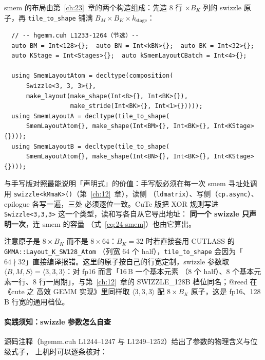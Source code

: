 smem 的布局由第~\ref{ch:23}~章的两个构造组成：先造 8 行 $\times B_K$ 列的
swizzle 原子，再 \texttt{tile\_\allowbreak{}to\_\allowbreak{}shape} 铺满
$B_M\times B_K\times k_{\mathrm{stage}}$：

\begin{lstlisting}
  // -- hgemm.cuh L1233-1264（节选）--
  auto BM = Int<128>{};  auto BN = Int<kBN>{};  auto BK = Int<32>{};
  auto KStage = Int<Stages>{};  auto kSmemLayoutCBatch = Int<4>{};

  using SmemLayoutAtom = decltype(composition(
      Swizzle<3, 3, 3>{},
      make_layout(make_shape(Int<8>{}, Int<BK>{}),
                  make_stride(Int<BK>{}, Int<1>{}))));
  using SmemLayoutA = decltype(tile_to_shape(
      SmemLayoutAtom{}, make_shape(Int<BM>{}, Int<BK>{}, Int<KStage>{})));
  using SmemLayoutB = decltype(tile_to_shape(
      SmemLayoutAtom{}, make_shape(Int<BN>{}, Int<BK>{}, Int<KStage>{})));
\end{lstlisting}

与手写版对照最能说明「声明式」的价值：手写版必须在每一次 smem 寻址处调用
\texttt{swizzle}\allowbreak\texttt{<kMmaK>()}（第~\ref{ch:12}~章），读侧
（\texttt{ldmatrix}）、写侧（\texttt{cp.async}）、epilogue 各写一遍，三处
必须逐位一致。CuTe 版把 XOR
规则写进 \texttt{Swizzle\allowbreak{}<3,\allowbreak{}3,\allowbreak{}3>} 这一个类型，读和写各自从它导出地址：
\textbf{同一个 swizzle 只声明一次}，连 smem 的容量
（式~\eqref{eq:24-smem}）也由它算出。

注意原子是 $8\times B_K$ 而不是 $8\times 64$：$B_K=32$ 时若直接套用 CUTLASS 的
\texttt{GMMA::}\allowbreak\texttt{Layout\_K\_}\allowbreak\texttt{SW128\_Atom}
（列宽 64 个 half），\texttt{tile\_\allowbreak{}to\_\allowbreak{}shape}
会因为「$64\nmid32$」直接编译报错。这里的原子按自己的行宽定制，swizzle 参数取
$\langle B,M,S\rangle=\langle3,3,3\rangle$：对 fp16 而言「16\,B 一个基本元素
（8 个 half）、8 个基本元素一行、8 行一周期」，与第~\ref{ch:12}~章的
SWIZZLE\_128B 档位同名；@reed 在《cute 之 高效 GEMM 实现》里同样取
$\langle3,3,3\rangle$ 配 $8\times B_K$ 原子，这是 fp16、128\,B 行宽的通用档位。

\paragraph{实践须知：swizzle 参数怎么自查}

源码注释（hgemm.cuh L1244--1247 与 L1249--1252）给出了参数的物理含义与位级式子，
上机时可以逐条核对：


